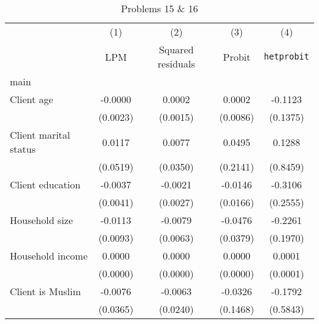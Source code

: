 \begin{table}[htbp]\centering
\def\sym#1{\ifmmode^{#1}\else\(^{#1}\)\fi}
\caption{Problems 15 \& 16\label{q16}}
\begin{tabular}{l*{4}{c}}
\toprule
                    &\multicolumn{1}{c}{(1)}&\multicolumn{1}{c}{(2)}&\multicolumn{1}{c}{(3)}&\multicolumn{1}{c}{(4)}\\
                    &\multicolumn{1}{c}{LPM}&\multicolumn{1}{c}{Squared residuals}&\multicolumn{1}{c}{Probit}&\multicolumn{1}{c}{\texttt{hetprobit}}\\
\midrule
main                &                     &                     &                     &                     \\
Client age          &     -0.0000         &      0.0002         &      0.0002         &     -0.1123         \\
                    &    (0.0023)         &    (0.0015)         &    (0.0086)         &    (0.1375)         \\
\addlinespace
Client marital status&      0.0117         &      0.0077         &      0.0495         &      0.1288         \\
                    &    (0.0519)         &    (0.0350)         &    (0.2141)         &    (0.8459)         \\
\addlinespace
Client education    &     -0.0037         &     -0.0021         &     -0.0146         &     -0.3106         \\
                    &    (0.0041)         &    (0.0027)         &    (0.0166)         &    (0.2555)         \\
\addlinespace
Household size      &     -0.0113         &     -0.0079         &     -0.0476         &     -0.2261         \\
                    &    (0.0093)         &    (0.0063)         &    (0.0379)         &    (0.1970)         \\
\addlinespace
Household income    &      0.0000         &      0.0000         &      0.0000         &      0.0001         \\
                    &    (0.0000)         &    (0.0000)         &    (0.0000)         &    (0.0001)         \\
\addlinespace
Client is Muslim    &     -0.0076         &     -0.0063         &     -0.0326         &     -0.1792         \\
                    &    (0.0365)         &    (0.0240)         &    (0.1468)         &    (0.5843)         \\

\end{tabular}
\end{table}
